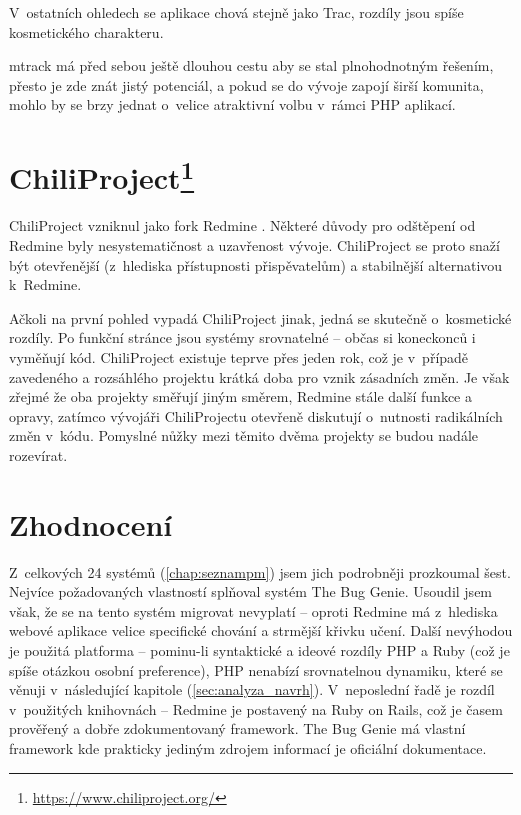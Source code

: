 \documentclass[thesis=B,czech]{FITthesis}[2012/05/02]
\begin{document}
V~ostatních ohledech se aplikace chová stejně jako Trac, rozdíly jsou
spíše kosmetického charakteru.

mtrack má před sebou ještě dlouhou cestu aby se stal plnohodnotným
řešením, přesto je zde znát jistý potenciál, a pokud se do vývoje zapojí
širší komunita, mohlo by se brzy jednat o~velice atraktivní volbu
v~rámci PHP aplikací.

\section[ChiliProject]{ChiliProject\footnote{\url{https://www.chiliproject.org/}}}

ChiliProject vzniknul jako \gls{fork} Redmine
\citep{ChiliProjectWhyFork}. Některé důvody pro odštěpení od Redmine
byly nesystematičnost a uzavřenost vývoje. ChiliProject se proto snaží
být otevřenější (z~hlediska přístupnosti přispěvatelům) a stabilnější
alternativou k~Redmine.

Ačkoli na první pohled vypadá ChiliProject jinak, jedná se skutečně
o~kosmetické rozdíly. Po funkční stránce jsou systémy srovnatelné -- občas
si koneckonců i vyměňují kód. ChiliProject existuje teprve přes jeden
rok, což je v~případě zavedeného a rozsáhlého projektu krátká doba pro
vznik zásadních změn. Je však zřejmé že oba projekty směřují jiným
směrem, Redmine stále  další funkce a opravy, zatímco
vývojáři ChiliProjectu otevřeně diskutují o~nutnosti radikálních změn
v~kódu. Pomyslné nůžky mezi těmito dvěma projekty se budou nadále
rozevírat.

\section{Zhodnocení}

Z~celkových 24 systémů (\ref{chap:seznampm}) jsem jich podrobněji
prozkoumal šest. Nejvíce požadovaných vlastností splňoval systém The Bug
Genie. Usoudil jsem však, že se na tento systém migrovat nevyplatí --
oproti Redmine má z~hlediska webové aplikace velice specifické chování a
strmější křivku učení. Další nevýhodou je použitá platforma -- pominu-li
syntaktické a ideové rozdíly PHP a Ruby (což je spíše otázkou osobní
preference), PHP nenabízí srovnatelnou dynamiku, které se věnuji
v~následující kapitole (\ref{sec:analyza_navrh}). V~neposlední řadě je
rozdíl v~použitých knihovnách -- Redmine je postavený na Ruby on Rails,
což je časem prověřený a dobře zdokumentovaný framework. The Bug Genie
má vlastní framework kde prakticky jediným zdrojem informací je
oficiální dokumentace.
\end{document}
